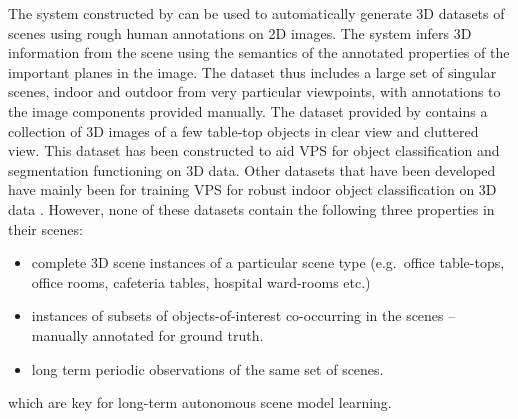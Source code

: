 \documentclass[letterpaper, 10 pt, conference]{ieeeconf}  %
\begin{document}
The system constructed by \cite{Russell:CVPR2009} can be used to automatically generate 3D datasets of scenes using rough human annotations on 2D images. The system infers 3D information from the scene using the semantics of the annotated properties of the important planes in the image. The dataset thus includes a large set of singular scenes, indoor and outdoor from very particular viewpoints, with annotations to the image components provided manually.
The dataset provided by \cite{Sun:ECCV2010} contains a collection of 3D images of a few table-top objects in clear view and cluttered view. This dataset has been constructed to aid VPS for object classification and segmentation functioning on 3D data. Other datasets that have been developed have mainly been for training VPS for robust indoor object classification on 3D data \cite{WillowGarage:2011,Kimmel:ACCV2010}.
However, none of these datasets contain the following three properties in their scenes:
\begin{itemize}
	\item complete 3D scene instances of a particular scene type (e.g.\ office table-tops, office rooms, cafeteria tables, hospital ward-rooms etc.)
	\item instances of subsets of objects-of-interest co-occurring in the scenes -- manually annotated for ground truth.
	\item long term periodic observations of the same set of scenes.
\end{itemize}
which are key for long-term autonomous scene model learning.
\end{document}
